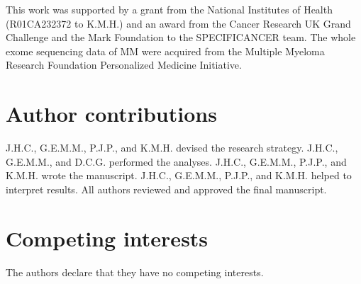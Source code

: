 \documentclass[english, 10pt, letterpaper]{article}
\begin{document}
This work was supported by a grant from the National Institutes of Health (R01CA232372 to K.M.H.) and an award from the Cancer Research UK Grand Challenge and the Mark Foundation to the SPECIFICANCER team. 
The whole exome sequencing data of MM were acquired from the Multiple Myeloma Research Foundation Personalized Medicine Initiative.

\section*{Author contributions}

J.H.C., G.E.M.M., P.J.P., and K.M.H. devised the research strategy. 
J.H.C., G.E.M.M., and D.C.G. performed the analyses. 
J.H.C., G.E.M.M., P.J.P., and K.M.H. wrote the manuscript. 
J.H.C., G.E.M.M., P.J.P., and K.M.H. helped to interpret results. 
All authors reviewed and approved the final manuscript.

\section*{Competing interests}

The authors declare that they have no competing interests.





{}

\newpage


\end{document}
